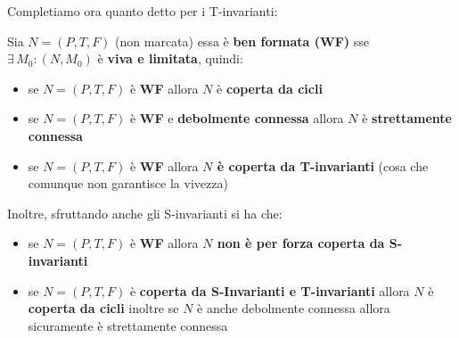 \documentclass[a4paper,12pt, oneside]{book}
\begin{document}
Completiamo ora quanto detto per i T-invarianti:
\begin{teorema}
  Sia $N = (P, T, F )$ (non marcata) essa è \textbf{ben formata (WF)} sse
  $\exists\,M_0:(N,M_0)$ è \textbf{viva e limitata}, quindi:
  \begin{itemize}
    \item se $N = (P, T , F )$ è \textbf{WF} allora $N$ è \textbf{coperta da
      cicli} 
    \item se $N = (P, T , F )$ è \textbf{WF} e \textbf{debolmente connessa}
    allora $N$ è \textbf{strettamente connessa}
    \item se $N = (P, T , F )$ è \textbf{WF} allora \textbf{$N$ è coperta
      da T-invarianti} (cosa che comunque non garantisce la vivezza)
  \end{itemize}
  Inoltre, sfruttando anche gli S-invarianti si ha che:
  \begin{itemize}
    \item se $N = (P, T , F )$ è \textbf{WF} allora \textbf{$N$ non è per forza
      coperta da S-invarianti}
    \item se $N = (P, T , F )$ è \textbf{coperta da S-Invarianti e
      T-invarianti} allora $N$ è \textbf{coperta da cicli} inoltre se $N$ è
    anche debolmente connessa allora sicuramente è strettamente connessa 
  \end{itemize}
\end{teorema}
\end{document}
